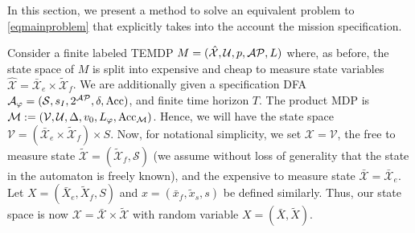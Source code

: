 In this section, we present a method to solve an equivalent problem to \eqref{eqmainproblem} that explicitly takes into the account the mission specification.

Consider a finite labeled TEMDP $M=(\mathcal{\hat{X}},\mathcal{U},p,\mathcal{AP},L)$ where, as before, the state space of $M$ is split into expensive and cheap to measure state variables $\mathcal{\hat{X}} = \mathcal{\bar{X}}_e \times \mathcal{\tilde{X}}_f$. We are additionally given a specification DFA $\mathcal{A}_{\varphi} = (\mathcal{S},s_I,2^{\mathcal{AP}}, \delta,\textrm{Acc})$, and finite time horizon $T$. The product MDP is $\mathcal{M}:= (\mathcal{V},\mathcal{U}, \Delta,v_0,L_{\varphi},\textrm{Acc}_{\mathcal{M}})$.  Hence, we will have the state space $\mathcal{V} = (\mathcal{\bar{X}}_e \times \mathcal{\tilde{X}}_f) \times S$. Now, for notational simplicity, we set $\mathcal{X} = \mathcal{V}$, the free to measure state $\mathcal{\tilde{X}} = (\mathcal{\tilde{X}}_f,\mathcal{S})$ (we assume without loss of generality that the state in the automaton is freely known), and the expensive to measure state $\mathcal{\bar{X}} = \mathcal{\bar{X}}_e$. Let $X = (\bar{X}_e,\tilde{X}_f,S)$ and $x = (\bar{x}_f,\tilde{x}_s,s)$ be defined similarly. Thus, our state space is now $\mathcal{X}= \mathcal{\bar{X}} \times \mathcal{\tilde{X}}$ with random variable $X = (\bar{X},\tilde{X})$. 

